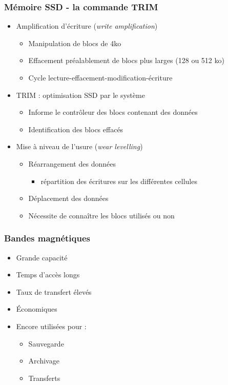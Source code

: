 \begin{frame}
\frametitle{Mémoire SSD - la commande TRIM}
\begin{itemize}

\item Amplification d’écriture (\textit{write amplification})
\begin{itemize}
\item Manipulation de blocs de 4ko
\item Effacement préalablement de blocs plus larges (128 ou 512 ko)
\item Cycle lecture-effacement-modification-écriture
\end{itemize}

\item TRIM : optimisation SSD par le système
\begin{itemize}
\item Informe le contrôleur des blocs contenant des données
\item Identification des blocs effacés
\end{itemize}

\item Mise à niveau de l’usure (\textit{wear levelling})
\begin{itemize}
\item Réarrangement des données
\begin{itemize}
\item répartition des écritures sur les différentes cellules
\end{itemize}

\item Déplacement des données 
\item Nécessite de connaître les blocs utilisés ou non
\end{itemize}

\end{itemize}

\end{frame}

\begin{frame}
\frametitle{Bandes magnétiques}
\begin{itemize}
\item Grande capacité
\item Temps d’accès longs
\item Taux de transfert élevés
\item Économiques
\item Encore utilisées pour :
\begin{itemize}
\item Sauvegarde
\item Archivage
\item Transferts
\end{itemize}
\end{itemize}
\end{frame}

